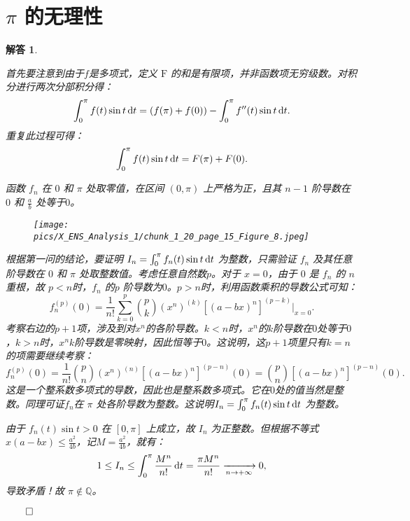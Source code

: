 \documentclass[12pt,UTF8]{ctexbook}
\theoremstyle{exercisestyle}
\theoremstyle{solutionstyle}
\newtheorem*{solution*}{解答}
\newenvironment{solution}
  {\begin{solution*}}
  {\hfill\ensuremath{\qed}\end{solution*}}
\begin{document}
\section{$\pi$ 的无理性}
\begin{solution}
  \begin{subquestions}
    \item 首先要注意到由于$f$是多项式，定义 $\mathrm{F}$ 的和是有限项，并非函数项无穷级数。对积分进行两次分部积分得：
    $$
    \int_0^{\pi} f(t) \sin t \,\mathrm{d}t = \left(f(\pi) + f(0)\right) - \int_0^{\pi} f''(t) \sin t \,\mathrm{d}t.
    $$
    重复此过程可得：
    $$
    \int_0^{\pi} f(t) \sin t \,\mathrm{d}t = F(\pi) + F(0).
    $$
    \item 函数 $f_n$ 在 $0$ 和 $\pi$ 处取零值，在区间 $(0, \pi)$ 上严格为正，且其 $n-1$ 阶导数在 $0$ 和 $\frac{a}{b}$ 处等于$0$。
    \begin{figure}[htbp]
      \centering
      \texttt{[image: pics/X\_ENS\_Analysis\_1/chunk\_1\_20\_page\_15\_Figure\_8.jpeg]}
    \end{figure}
    \item 根据第一问的结论，要证明 $I_n = \int_0^{\pi} f_n(t) \sin t \,\mathrm{d}t$ 为整数，只需验证 $f_n$ 及其任意阶导数在 $0$ 和 $\pi$ 处取整数值。考虑任意自然数$p$。对于 $x=0$，由于 $0$ 是 $f_n$ 的 $n$ 重根，故 $p < n$时，$f_n$ 的$p$ 阶导数为$0$。$p > n$时，利用函数乘积的导数公式可知：
    $$
    f_n^{(p)}(0) = \frac{1}{n!} \sum_{k=0}^p \binom{p}{k} (x^n)^{(k)} [(a - bx)^n]^{(p-k)} \Big|_{x=0}.
    $$
    考察右边的$p + 1$项，涉及到对$x^n$的各阶导数。$k < n$时，$x^n$的$k$阶导数在$0$处等于$0$，$k > n$时，$x^n$$k$阶导数是零映射，因此恒等于$0$。这说明，这$p + 1$项里只有$k=n$的项需要继续考察：
    $$
    f_n^{(p)}(0) = \frac{1}{n!}\binom{p}{n} (x^n)^{(n)}[(a - bx)^n]^{(p-n)}(0) = \binom{p}{n} [(a - bx)^n]^{(p-n)}(0).
    $$
    这是一个整系数多项式的导数，因此也是整系数多项式。它在$0$处的值当然是整数。同理可证$f_n$在 $\pi$ 处各阶导数为整数。这说明$I_n = \int_0^{\pi} f_n(t) \sin t \,\mathrm{d}t$ 为整数。
    
    由于 $f_n(t) \sin t > 0$ 在 $[0, \pi]$ 上成立，故 $I_n$ 为正整数。但根据不等式 $\displaystyle x(a - bx) \leq \frac{a^2}{4b}$，记$\displaystyle M = \frac{a^2}{4b}$，就有：
    $$
    1 \leq I_n \leq \int_0^\pi \frac{M^n}{n!} \,\mathrm{d}t = \frac{\pi M^n}{n!} \xrightarrow[n \to +\infty]{} 0,
    $$
    导致矛盾！故 $\pi \notin \mathbb{Q}$。
  \end{subquestions}
\end{solution}
\end{document}
